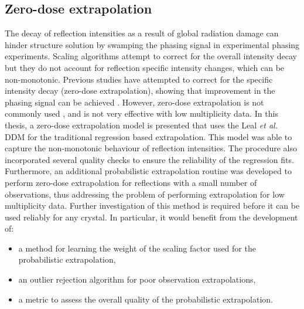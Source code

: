 \subsection{Zero-dose extrapolation}
\label{sub:Zero-dose extrapolation}
The decay of reflection intensities as a result of global radiation damage can hinder structure solution by swamping the phasing signal in experimental phasing experiments.
Scaling algorithms attempt to correct for the overall intensity decay but they do not account for reflection specific intensity changes, which can be non-monotonic.
Previous studies have attempted to correct for the specific intensity decay (zero-dose extrapolation), showing that improvement in the phasing signal can be achieved \cite{diederichs2003,diederichs2006}.
However, zero-dose extrapolation is not commonly used \cite{borek2007many}, and is not very effective with low multiplicity data.
In this thesis, a zero-dose extrapolation model is presented that uses the Leal \textit{et al.} DDM for the traditional regression based extrapolation.
This model was able to capture the non-monotonic behaviour of reflection intensities.
The procedure also incorporated several quality checks to ensure the reliability of the regression fits.
Furthermore, an additional probabilistic extrapolation routine was developed to perform zero-dose extrapolation for reflections with a small number of observations, thus addressing the problem of performing extrapolation for low multiplicity data.
Further investigation of this method is required before it can be used reliably for any crystal.
In particular, it would benefit from the development of:
\begin{itemize}
    \item a method for learning the weight of the scaling factor used for the probabilistic extrapolation,
    \item an outlier rejection algorithm for poor observation extrapolations,
    \item a metric to assess the overall quality of the probabilistic extrapolation.
\end{itemize}

